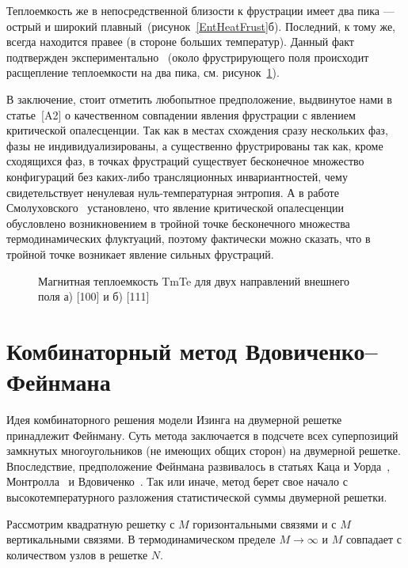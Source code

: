 Теплоемкость же в непосредственной близости к фрустрации имеет два пика --- острый и широкий плавный~(рисунок~\ref{EntHeatFrust}б). Последний, к тому же, всегда находится правее (в стороне больших температур). Данный факт подтвержден экспериментально~\cite{matsumura1997} (около фрустрирующего поля происходит расщепление теплоемкости на два пика, см. рисунок~\ref{new1}). 

В заключение, стоит отметить любопытное предположение, выдвинутое нами в  статье~[A2] о качественном совпадении явления фрустрации с явлением критической опалесценции. Так как в местах схождения сразу нескольких фаз, фазы не индивидуализированы, а существенно фрустрированы так как, кроме сходящихся фаз, в точках фрустраций существует бесконечное множество конфигураций без каких-либо трансляционных инвариантностей, чему свидетельствует ненулевая нуль-температурная энтропия. А в работе Смолуховского~\cite{smoluchowski1907} установлено, что явление критической опалесценции обусловлено возникновением в тройной точке бесконечного множества термодинамических флуктуаций, поэтому фактически можно сказать, что в тройной точке возникает явление сильных фрустраций.

 \begin{figure}[h]
 	\caption{Магнитная теплоемкость TmTe для двух направлений внешнего поля а) [100] и б) [111]~\cite{matsumura1997}}
 	\label{new1}
 \end{figure}

\section{Комбинаторный метод Вдовиченко--Фейнмана}\label{sec:markup}

Идея комбинаторного решения модели Изинга на двумерной решетке принадлежит Фейнману. Суть метода заключается в подсчете всех суперпозиций замкнутых многоугольников (не имеющих общих сторон) на двумерной решетке. Впоследствие, предположение Фейнмана развивалось в статьях Каца и Уорда~\cite{kac1952}, Монтролла~\cite{montroll1953} и Вдовиченко~\cite{vdovichenko1965}. Так или иначе, метод берет свое начало с высокотемпературного разложения статистической суммы двумерной решетки. 

Рассмотрим квадратную решетку с $M$ горизонтальными связями и с $M$ вертикальными связями. В термодинамическом пределе $M \rightarrow \infty$ и $M$ совпадает с количеством узлов в решетке $N$. 

